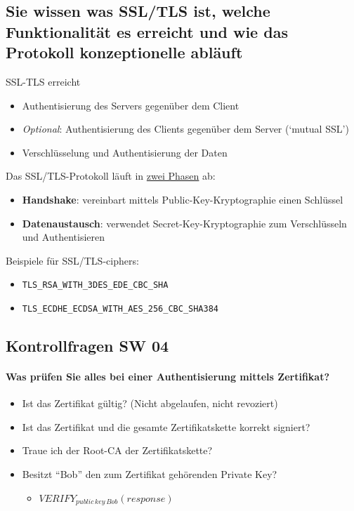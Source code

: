 \documentclass[10pt,a4paper]{article}
\begin{document}
\subsection*{Sie wissen was SSL/TLS ist, welche Funktionalität es erreicht und wie das Protokoll konzeptionelle abläuft}SSL-TLS erreicht
\begin{itemize}[noitemsep,topsep=0pt,leftmargin=*]
    \item Authentisierung des Servers gegenüber dem Client
    \item \textsl{Optional}: Authentisierung des Clients gegenüber dem Server (`mutual SSL')
    \item Verschlüsselung und Authentisierung der Daten
\end{itemize}
Das SSL/TLS-Protokoll läuft in \underline{zwei Phasen} ab:
\begin{itemize}[noitemsep,topsep=0pt,leftmargin=*]
    \item \textbf{Handshake}: vereinbart mittels Public-Key-Kryptographie einen Schlüssel
    \item \textbf{Datenaustausch}: verwendet Secret-Key-Kryptographie zum Verschlüsseln und Authentisieren
\end{itemize}
Beispiele für SSL/TLS-ciphers:
\begin{itemize}[noitemsep,topsep=0pt,leftmargin=*]
    \item \verb|TLS_RSA_WITH_3DES_EDE_CBC_SHA|
    \item \verb|TLS_ECDHE_ECDSA_WITH_AES_256_CBC_SHA384|
\end{itemize}

\subsection*{Kontrollfragen SW 04}
\paragraph*{Was prüfen Sie alles bei einer Authentisierung mittels Zertifikat?}
\begin{itemize}[noitemsep,topsep=0pt,leftmargin=*]
    \item Ist das Zertifikat gültig? (Nicht abgelaufen, nicht revoziert)
    \item Ist das Zertifikat und die gesamte Zertifikatskette korrekt signiert?
    \item Traue ich der Root-CA der Zertifikatskette?
    \item Besitzt "`Bob"' den zum Zertifikat gehörenden Private Key?
    \begin{itemize}[noitemsep,topsep=0pt,leftmargin=*]
        \item $VERIFY_{public\,key\,Bob}(response)$
    \end{itemize}
\end{itemize}
\end{document}
